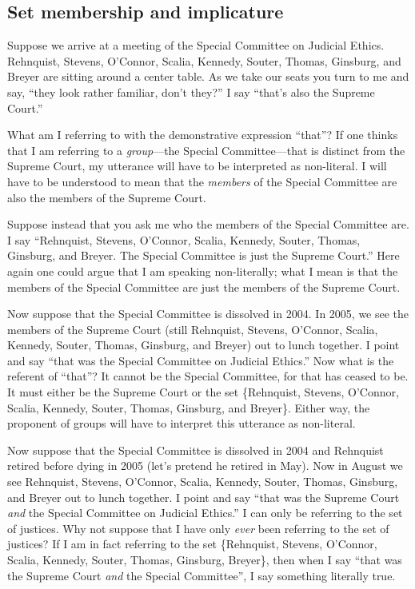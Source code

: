 \documentclass[11pt]{article}
\begin{document}
\begin{spacing}{1.5}
\subsection{Set membership and implicature}
\label{implicate}
Suppose we arrive at a meeting of the Special Committee on Judicial
Ethics.  Rehnquist, Stevens, O'Connor, Scalia, Kennedy, Souter,
Thomas, Ginsburg, and Breyer are sitting around a center table.  As we
take our seats you turn to me and say, ``they look rather familiar,
don't they?''  I say ``that's also the Supreme Court.''

What am I referring to with the demonstrative expression ``that''?  If
one thinks that I am referring to a {\em group}---the Special
Committee---that is distinct from the Supreme Court, my utterance will
have to be interpreted as non-literal.  I will have to be understood
to mean that the {\em members} of the Special Committee are also the
members of the Supreme Court.

Suppose instead that you ask me who the members of the Special
Committee are.  I say ``Rehnquist, Stevens, O'Connor, Scalia, Kennedy,
Souter, Thomas, Ginsburg, and Breyer.  The Special Committee is just
the Supreme Court.''  Here again one could argue that I am speaking
non-literally; what I mean is that the members of the Special
Committee are just the members of the Supreme Court.

Now suppose that the Special Committee is dissolved in 2004.  In 2005,
we see the members of the Supreme Court (still Rehnquist, Stevens,
O'Connor, Scalia, Kennedy, Souter, Thomas, Ginsburg, and Breyer) out
to lunch together.  I point and say ``that was the Special Committee
on Judicial Ethics.''  Now what is the referent of ``that''?  It
cannot be the Special Committee, for that has ceased to be.  It must
either be the Supreme Court or the set \{Rehnquist, Stevens, O'Connor,
Scalia, Kennedy, Souter, Thomas, Ginsburg, and Breyer\}.  Either way,
the proponent of groups will have to interpret this utterance as
non-literal.

Now suppose that the Special Committee is dissolved in 2004 and
Rehnquist retired before dying in 2005 (let's pretend he retired in
May).  Now in August we see Rehnquist, Stevens, O'Connor, Scalia,
Kennedy, Souter, Thomas, Ginsburg, and Breyer out to lunch together.
I point and say ``that was the Supreme Court {\em and} the Special
Committee on Judicial Ethics.''  I can only be referring to the set of
justices.  Why not suppose that I have only {\em ever} been referring
to the set of justices?  If I am in fact referring to the set
\{Rehnquist, Stevens, O'Connor, Scalia, Kennedy, Souter, Thomas,
Ginsburg, Breyer\}, then when I say ``that was the Supreme Court {\em
  and} the Special Committee'', I say something literally true.


\end{spacing}
\end{document}

